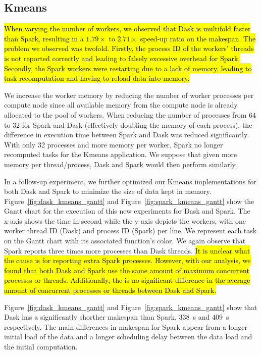 \documentclass[AMA,STIX1COL]{WileyNJD-v2}
\newcommand{\HL}[1]{\hl{#1}}
\begin{document}
\subsection{Kmeans}
\HL{
	When varying the number of workers, we observed that Dask is multifold faster
	than Spark, resulting in a $1.79\times$ to $2.71\times$ speed-up ratio on the makespan.
	The problem we observed was twofold.
	Firstly, the process ID of the workers' threads is not reported correctly and 
	leading to falsely excessive overhead for Spark.
	Secondly, the Spark workers were restarting due to a lack of memory, leading 
	to task recomputation and having to reload data into memory.
}
							
We increase the worker memory by reducing the number of worker processes per
compute node since all available memory from the compute node is already allocated to the pool of workers.
When reducing the number of processes from 64 to 32 for Spark and Dask 
(effectively doubling the memory of each process), the difference in execution time between Spark and Dask was reduced significantly.
With only 32 processes and more memory per worker, Spark no longer recomputed tasks for the Kmeans application.
We suppose that given more memory per thread/process, Dask and Spark would then perform similarly.
							
In a follow-up experiment, we further optimized our Kmeans implementations for both Dask and Spark to minimize the size of data kept in memory.
Figure~{\ref{fig:dask_kmeans_gantt}} and Figure~{\ref{fig:spark_kmeans_gantt}} show the Gantt chart for the execution
of this new experiments for Dask and Spark.
The x-axis shows the time in second while the y-axis depicts the workers, with 
one worker thread ID (Dask) and process ID (Spark) per line.
We represent each task on the Gantt chart with its associated function's color.
We again observe that Spark reports three times more processes than Dask threads.
\HL{
	It is unclear what the cause is for reporting extra Spark processes.
	However, with our analysis, we found that both Dask and Spark use the same 
	amount of maximum concurrent processes or threads.
	Additionally, the is no significant difference in the average amount of 
	concurrent processes or threads between Dask and Spark.
}
							
Figure~{\ref{fig:dask_kmeans_gantt}} and Figure~{\ref{fig:spark_kmeans_gantt}}
show that Dask has a significantly shorther makespan than Spark, {\SI{338}{\second}}
and {\SI{409}{\second}} respectively.
The main differences in makespan for Spark appear from a longer initial load of the data
and a longer scheduling delay between the data load and the initial computation.
							
\end{document}
